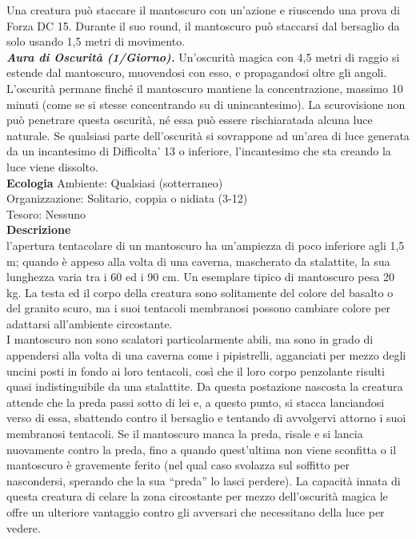 \begin{multicols}{2}
Una creatura può staccare il mantoscuro con un'azione e riuscendo una prova di Forza DC  15. Durante il suo round, il mantoscuro può staccarsi dal bersaglio da solo usando 1,5 metri di movimento.\\
\emph{\textbf{Aura di Oscurità (1/Giorno).}} Un'oscurità magica con 4,5 metri di raggio si estende dal mantoscuro, muovendosi con esso, e propagandosi oltre gli angoli. L'oscurità permane finché il mantoscuro mantiene la concentrazione, massimo 10 minuti (come se si stesse concentrando su di unincantesimo). La scurovisione non può penetrare  questa oscurità, né essa può essere rischiaratada alcuna luce naturale. Se qualsiasi parte dell'oscurità si sovrappone ad un'area di  luce generata da un incantesimo di Difficolta' 13 o inferiore, l'incantesimo che sta creando la luce viene dissolto.\\
\textbf{Ecologia}
Ambiente: Qualsiasi (sotterraneo)\\
Organizzazione: Solitario, coppia o nidiata (3-12)\\
Tesoro: Nessuno\\
\textbf{Descrizione}\\
l'apertura tentacolare di un mantoscuro ha un’ampiezza di poco inferiore agli 1,5 m; quando è appeso alla volta di una caverna, mascherato da stalattite, la sua lunghezza varia tra i 60 ed i 90 cm. Un esemplare tipico di mantoscuro pesa 20 kg. La testa ed il corpo della creatura sono solitamente del colore del basalto o del granito scuro, ma i suoi tentacoli membranosi possono cambiare colore per adattarsi all'ambiente circostante.\\

I mantoscuro non sono scalatori particolarmente abili, ma sono in grado di appendersi alla volta di una caverna come i pipistrelli, agganciati per mezzo degli uncini posti in fondo ai loro tentacoli, così che il loro corpo penzolante risulti quasi indistinguibile da una stalattite. Da questa postazione nascosta la creatura attende che la preda passi sotto di lei e, a questo punto, si stacca lanciandosi verso di essa, sbattendo contro il bersaglio e tentando di avvolgervi attorno i suoi membranosi tentacoli. Se il mantoscuro manca la preda, risale e si lancia nuovamente contro la preda, fino a quando quest’ultima non viene sconfitta o il mantoscuro è gravemente ferito (nel qual caso svolazza sul soffitto per nascondersi, sperando che la sua “preda” lo lasci perdere). La capacità innata di questa creatura di celare la zona circostante per mezzo dell'oscurità magica le offre un ulteriore vantaggio contro gli avversari che necessitano della luce per vedere.\\


\end{multicols}
